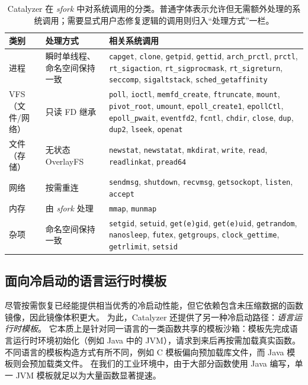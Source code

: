 \documentclass[letterpaper,twocolumn,10pt]{article}
\newcommand{\sys}{Catalyzer}
\begin{document}
\begin{table}[t]
  \centering
  \small
  \begin{tabularx}{\textwidth}{p{1.6cm}p{2.5cm}X}
    \toprule
    类别 & 处理方式 & 相关系统调用 \\
    \midrule
    进程 & 瞬时单线程、命名空间保持一致 & \texttt{capget}, \texttt{clone}, \texttt{getpid}, \texttt{gettid}, \texttt{arch\_prctl}, \texttt{prctl}, \texttt{rt\_sigaction}, \texttt{rt\_sigprocmask}, \texttt{rt\_sigreturn}, \texttt{seccomp}, \texttt{sigaltstack}, \texttt{sched\_getaffinity} \\
    VFS（文件/网络） & 只读 FD 继承 & \texttt{poll}, \texttt{ioctl}, \texttt{memfd\_create}, \texttt{ftruncate}, \texttt{mount}, \texttt{pivot\_root}, \texttt{umount}, \texttt{epoll\_create1}, \texttt{epollCtl}, \texttt{epoll\_pwait}, \texttt{eventfd2}, \texttt{fcntl}, \texttt{chdir}, \texttt{close}, \texttt{dup}, \texttt{dup2}, \texttt{lseek}, \texttt{openat} \\
    文件（存储） & 无状态 OverlayFS & \texttt{newstat}, \texttt{newstatat}, \texttt{mkdirat}, \texttt{write}, \texttt{read}, \texttt{readlinkat}, \texttt{pread64} \\
    网络 & 按需重连 & \texttt{sendmsg}, \texttt{shutdown}, \texttt{recvmsg}, \texttt{getsockopt}, \texttt{listen}, \texttt{accept} \\
    内存 & 由 \emph{sfork} 处理 & \texttt{mmap}, \texttt{munmap} \\
    杂项 & 命名空间保持一致 & \texttt{setgid}, \texttt{setuid}, \texttt{get(e)gid}, \texttt{get(e)uid}, \texttt{getrandom}, \texttt{nanosleep}, \texttt{futex}, \texttt{getgroups}, \texttt{clock\_gettime}, \texttt{getrlimit}, \texttt{setsid} \\
    \bottomrule
  \end{tabularx}
  \caption{\sys{} 在 \emph{sfork} 中对系统调用的分类。普通字体表示允许但无需额外处理的系统调用；需要显式用户态修复逻辑的调用则归入“处理方式”一栏。}
  \label{tab:syscalls}
\end{table}

\subsection{面向冷启动的语言运行时模板}\label{sec:runtime-template}
尽管按需恢复已经能提供相当优秀的冷启动性能，但它依赖包含未压缩数据的函数镜像，因此镜像体积更大。
为此，\sys{} 还提供了另一种冷启动路径：\emph{语言运行时模板}。
它本质上是针对同一语言的一类函数共享的模板沙箱：模板先完成语言运行时环境初始化（例如 Java 中的 JVM），请求到来后再按需加载真实函数。
不同语言的模板构造方式有所不同，例如 C 模板偏向预加载库文件，而 Java 模板则会预加载类文件。
在我们的工业环境中，由于大部分函数使用 Java 编写，单一 JVM 模板就足以为大量函数显著提速。
\end{document}
